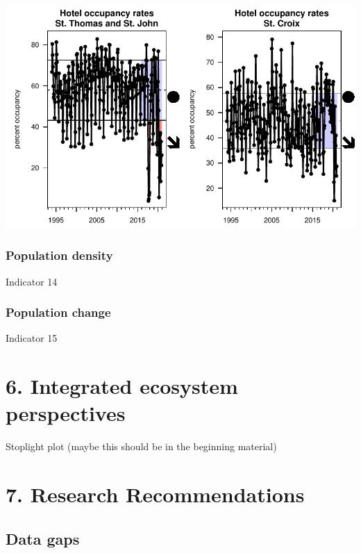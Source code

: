 \documentclass[
  letterpaper,
  oneside,
  open=any]{scrbook}
\begin{document}
\includegraphics{Report_book_files/Risk_indicators_files/figure-pdf/unnamed-chunk-15-1.pdf}

\subsection{Population density}\label{population-density}

Indicator 14

\subsection{Population change}\label{population-change}

Indicator 15


\chapter{6. Integrated ecosystem
perspectives}\label{integrated-ecosystem-perspectives}

Stoplight plot (maybe this should be in the beginning material)


\chapter{7. Research Recommendations}\label{research-recommendations}

\section{Data gaps}\label{data-gaps}
\end{document}
